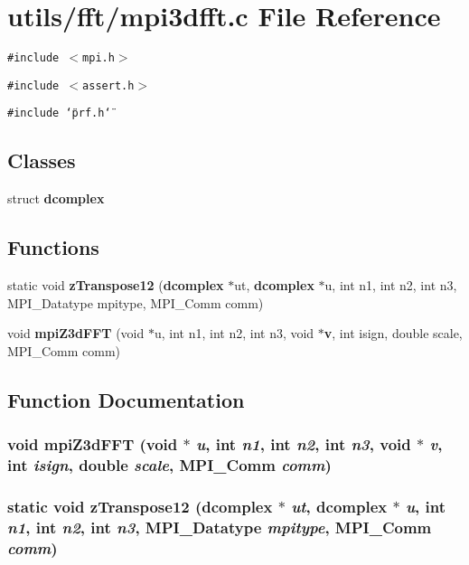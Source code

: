 \section{utils/fft/mpi3dfft.c File Reference}
\label{mpi3dfft_8c}
{\tt \#include $<$mpi.h$>$}\par
{\tt \#include $<$assert.h$>$}\par
{\tt \#include \char`\"{}prf.h\char`\"{}}\par
\subsection*{Classes}
\begin{CompactItemize}
\item 
struct {\bf dcomplex}
\end{CompactItemize}
\subsection*{Functions}
\begin{CompactItemize}
\item 
static void {\bf z\-Transpose12} ({\bf dcomplex} $\ast$ut, {\bf dcomplex} $\ast$u, int n1, int n2, int n3, MPI\_\-Datatype mpitype, MPI\_\-Comm comm)
\item 
void {\bf mpi\-Z3d\-FFT} (void $\ast$u, int n1, int n2, int n3, void $\ast${\bf v}, int isign, double scale, MPI\_\-Comm comm)
\end{CompactItemize}


\subsection{Function Documentation}
\subsubsection{\setlength{\rightskip}{0pt plus 5cm}void mpi\-Z3d\-FFT (void $\ast$ {\em u}, int {\em n1}, int {\em n2}, int {\em n3}, void $\ast$ {\em v}, int {\em isign}, double {\em scale}, MPI\_\-Comm {\em comm})}\label{mpi3dfft_8c_0e65b820b0862f5165be8457a6f8e632}


\subsubsection{\setlength{\rightskip}{0pt plus 5cm}static void z\-Transpose12 ({\bf dcomplex} $\ast$ {\em ut}, {\bf dcomplex} $\ast$ {\em u}, int {\em n1}, int {\em n2}, int {\em n3}, MPI\_\-Datatype {\em mpitype}, MPI\_\-Comm {\em comm})\hspace{0.3cm}{\tt  [static]}}\label{mpi3dfft_8c_57cf08940e486cb0a8a8bccad6b80c2a}


